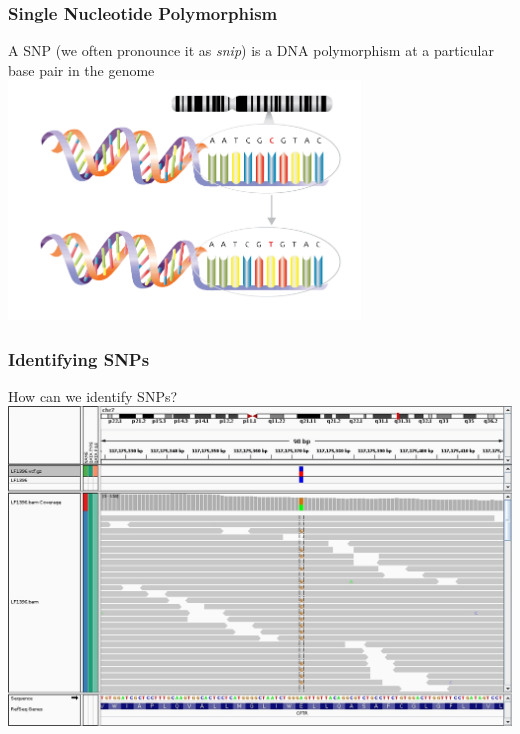 \documentclass{beamer}
\begin{document}
\begin{frame}
	\frametitle{Single Nucleotide Polymorphism}
	A SNP (we often pronounce it as \textit{snip}) is a DNA polymorphism at a particular base pair in the genome\\
		\centering		\includegraphics[keepaspectratio, width  = 0.7\textwidth]{img/SNP}
\end{frame}


\begin{frame}
	\frametitle{Identifying SNPs}
\Large How can we identify SNPs? \pause
	\centering		\includegraphics[keepaspectratio, width  = \textwidth]{img/IGV}
\end{frame}
\end{document}
